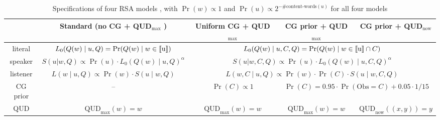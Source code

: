 \begin{table}
\centering
\begin{tabular}{c|c|c|c|c}
         & Standard (no CG + QUD$_\text{max}$ ) & Uniform CG + QUD$_\text{max}$ & CG prior + QUD$_\text{max}$ & CG prior + QUD$_\text{now}$ \\ \hline 
literal  & $L_0(Q(w) \mid u, Q) = \Pr(Q(w) \mid w \in \llbracket \text{u} \rrbracket)$ & 
\multicolumn{3}{c}{$L_0(Q(w) \mid u, C, Q) = \Pr(Q(w) \mid w \in \llbracket \text{u} \rrbracket \cap C)$} \\
speaker  & $S(u | w, Q) \propto \Pr(u) \cdot L_0(Q(w) \mid u, Q)^\alpha $ & \multicolumn{3}{c}{$S(u | w, C, Q) \propto \Pr(u) \cdot L_0(Q(w) \mid u, C, Q)^\alpha$} \\
listener & $L(w \mid u, Q) \propto \Pr(w) \cdot S(u \mid w, Q)$ & \multicolumn{3}{c}{$L(w, C \mid u, Q) \propto \Pr(w) \cdot \Pr(C) \cdot S(u \mid w, C, Q)$} \\
CG prior & -- & $\Pr(C) \propto 1$ & \multicolumn{2}{c}{$\Pr(C)=0.95\cdot\Pr(\text{Obs}=C)+0.05\cdot 1/15$} \\
QUD      & $\text{QUD}_\text{max}(w)=w$ & $\text{QUD}_\text{max}(w)=w$ & $\text{QUD}_\text{max}(w)=w$ & $\text{QUD}_\text{now}((x,y))=y$\\
\hline
\end{tabular}
\caption{Specifications of four RSA models \label{tab:models}, with $\Pr(w)\propto1$ and $\Pr(u) \propto 2^{-\#\textrm{content-words}(u)}$ for all four models}
\end{table} 
 
